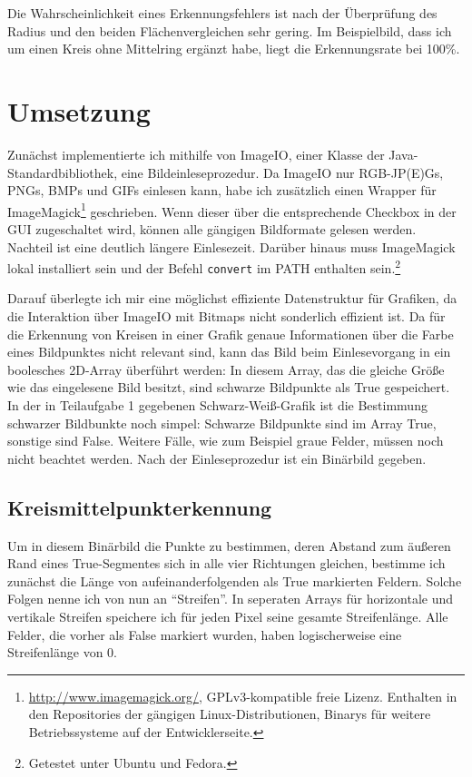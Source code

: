 Die Wahrscheinlichkeit eines Erkennungsfehlers ist nach der Überprüfung des Radius und den beiden Flächenvergleichen sehr gering. Im Beispielbild, dass ich um einen Kreis ohne Mittelring ergänzt habe, liegt die Erkennungsrate bei 100\%.

\section{Umsetzung}
Zunächst implementierte ich mithilfe von ImageIO, einer Klasse der Java-Standardbibliothek, eine Bildeinleseprozedur. Da ImageIO nur RGB-JP(E)Gs, PNGs, BMPs und GIFs einlesen kann, habe ich zusätzlich einen Wrapper für ImageMagick\footnote{\url{http://www.imagemagick.org/}, GPLv3-kompatible freie Lizenz. Enthalten in den Repositories der gängigen Linux-Distributionen, Binarys für weitere Betriebssysteme auf der Entwicklerseite.} geschrieben. 
Wenn dieser über die entsprechende Checkbox in der GUI zugeschaltet wird, können alle gängigen Bildformate gelesen werden. 
Nachteil ist eine deutlich längere Einlesezeit. Darüber hinaus muss ImageMagick lokal installiert sein und der Befehl \texttt{convert} im PATH enthalten sein.\footnote{Getestet unter Ubuntu und Fedora.} 

Darauf überlegte ich mir eine möglichst effiziente Datenstruktur für Grafiken, da die Interaktion über ImageIO mit Bitmaps nicht sonderlich effizient ist. Da für die Erkennung von Kreisen in einer Grafik genaue Informationen über die Farbe eines Bildpunktes nicht relevant sind, kann das Bild beim Einlesevorgang in ein boolesches 2D-Array überführt werden: In diesem Array, das die gleiche Größe wie das eingelesene Bild besitzt, sind schwarze Bildpunkte als True gespeichert.
In der in Teilaufgabe 1 gegebenen Schwarz-Weiß-Grafik ist die Bestimmung schwarzer Bildbunkte noch simpel: Schwarze Bildpunkte sind im Array True, sonstige sind False. Weitere Fälle, wie zum Beispiel graue Felder, müssen noch nicht beachtet werden.
Nach der Einleseprozedur ist ein Binärbild gegeben.

\subsection{Kreismittelpunkterkennung}
Um in diesem Binärbild die Punkte zu bestimmen, deren Abstand zum äußeren Rand eines True-Segmentes sich in alle vier Richtungen gleichen, bestimme ich zunächst die Länge von aufeinanderfolgenden als True markierten Feldern. Solche Folgen nenne ich von nun an "`Streifen"'. In seperaten Arrays für horizontale und vertikale Streifen speichere ich für jeden Pixel seine gesamte Streifenlänge.
Alle Felder, die vorher als False markiert wurden, haben logischerweise eine Streifenlänge von 0. 

